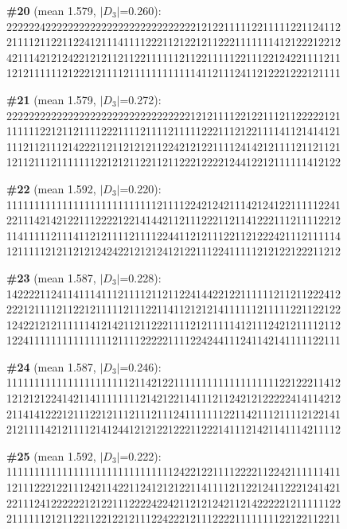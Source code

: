 \documentclass[10pt]{article}
\begin{document}
\noindent\textbf{\#20} (mean 1.579, $|D_3|$=0.260):\\
222222422222222222222222222222222212122111112211111221124112\\
211112112211224121114111122211212212112221111111412122212212\\
421114212124221212112112211111121122111112211122124221111211\\
121211111121222121111211111111111141121112411212221222121111\medskip

\noindent\textbf{\#21} (mean 1.579, $|D_3|$=0.272):\\
222222222222222222222222222222222121211112212211121122222121\\
111111221211211112221111211112111112221112122111141121414121\\
111211211121422211211212121122421212211112414212111121121121\\
121121112111111122121211221121122212222124412212111111412122\medskip

\noindent\textbf{\#22} (mean 1.592, $|D_3|$=0.220):\\
111111111111111111111111111211112242124211142124122111112241\\
221114214212211122221221414421121112221121141222111211112212\\
114111112111411212111121111224411212111221121222421112111114\\
121111121211212124242212121241212211122411111212122122211212\medskip

\noindent\textbf{\#23} (mean 1.587, $|D_3|$=0.228):\\
142222112411411141112111121121122414422122111111211211222412\\
222121111211221211111211122114112121214111111211111221122122\\
124221212111111412142112112221111212111114121112421211112112\\
122411111111111111121111222221111224244111241142141111122111\medskip

\noindent\textbf{\#24} (mean 1.587, $|D_3|$=0.246):\\
111111111111111111111121142122111111111111111111122122211412\\
121212122414211411111111214212211411121124212122222414114212\\
211414122212111221211121112111241111111221142111211112122141\\
212111142121111214124412121221222112221411121421141114211112\medskip

\noindent\textbf{\#25} (mean 1.592, $|D_3|$=0.222):\\
111111111111111111111111111111242212211112222112242111111411\\
121112221221112421142211241212122114111121122124112221241421\\
221112412222221212211122224224211212124211214222221211111122\\
211111121211221122122121112242221211122221111111122122112211\medskip
\end{document}
